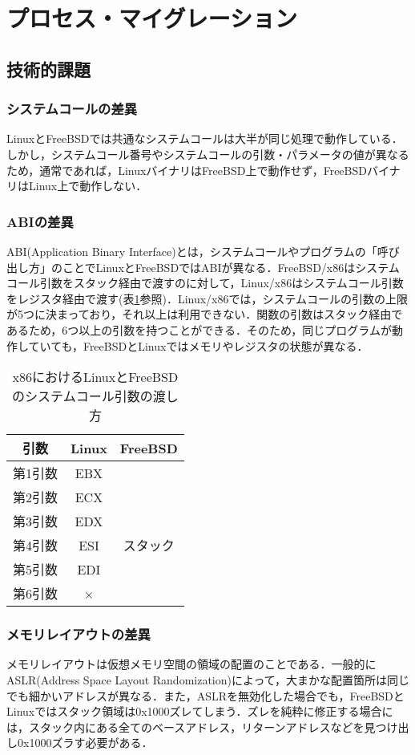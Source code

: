 \documentclass[11pt]{jarticle}
\begin{document}
\section{プロセス・マイグレーション}
\label{sec:PM}
\subsection{技術的課題}
\subsubsection{システムコールの差異}
LinuxとFreeBSDでは共通なシステムコールは大半が同じ処理で動作している．しかし，システムコール番号やシステムコールの引数・パラメータの値が異なるため，通常であれば，LinuxバイナリはFreeBSD上で動作せず，FreeBSDバイナリはLinux上で動作しない．
\subsubsection{ABIの差異}
ABI(Application Binary Interface)とは，システムコールやプログラムの「呼び出し方」のことでLinuxとFreeBSDではABIが異なる．FreeBSD/x86はシステムコール引数をスタック経由で渡すのに対して，Linux/x86はシステムコール引数をレジスタ経由で渡す(表\ref{tb:argument}参照)．Linux/x86では，システムコールの引数の上限が5つに決まっており，それ以上は利用できない．関数の引数はスタック経由であるため，6つ以上の引数を持つことができる．そのため，同じプログラムが動作していても，FreeBSDとLinuxではメモリやレジスタの状態が異なる．


\begin{table}
  \caption{x86におけるLinuxとFreeBSDのシステムコール引数の渡し方}
  \label{tb:argument}
  \begin{center}
  \begin{tabular}{|c|c|c|} \hline
    引数 & Linux & FreeBSD \\ \hline \hline
    第1引数 & EBX &  \\ \cline{1-2}
    第2引数 & ECX &  \\ \cline{1-2}
    第3引数 & EDX &  \\ \cline{1-2}
    第4引数 & ESI & スタック \\ \cline{1-2}
    第5引数 & EDI &  \\ \cline{1-2}
    第6引数 & × &  \\ \hline
  \end{tabular}
\end{center}
\end{table}

\subsubsection{メモリレイアウトの差異}
メモリレイアウトは仮想メモリ空間の領域の配置のことである．一般的にASLR(Address Space Layout Randomization)によって，大まかな配置箇所は同じでも細かいアドレスが異なる．また，ASLRを無効化した場合でも，FreeBSDとLinuxではスタック領域は0x1000ズレてしまう．ズレを純粋に修正する場合には，スタック内にある全てのベースアドレス，リターンアドレスなどを見つけ出し0x1000ズラす必要がある．
\end{document}
